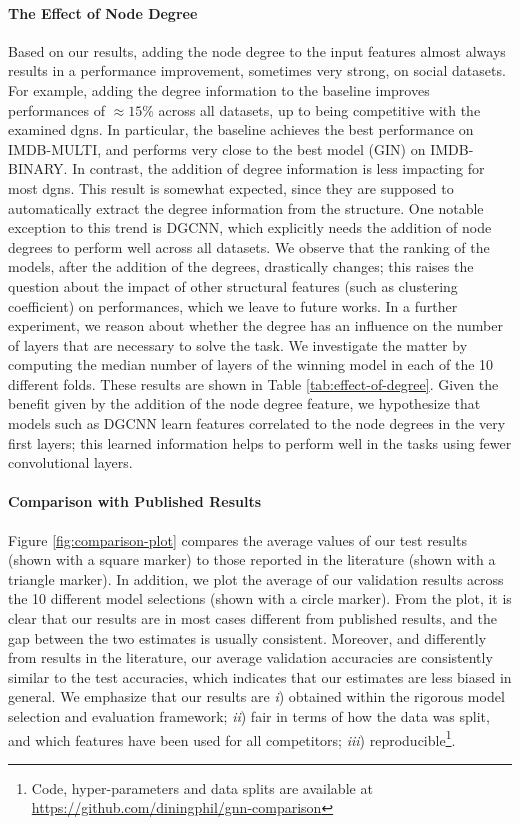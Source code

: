 \paragraph{The Effect of Node Degree}
Based on our results, adding the node degree to the input features almost always results in a performance improvement, sometimes very strong, on social datasets. For example, adding the degree information to the baseline improves performances of $\approx 15$\% across all datasets, up to being competitive with the examined \glspl{dgn}. In particular, the baseline achieves the best performance on IMDB-MULTI, and performs very close to the best model (GIN) on IMDB-BINARY. In contrast, the addition of degree information is less impacting for most \glspl{dgn}. This result is somewhat expected, since they are supposed to automatically extract the degree information from the structure. One notable exception to this trend is DGCNN, which explicitly needs the addition of node degrees to perform well across all datasets. We observe that the ranking of the models, after the addition of the degrees, drastically changes; this raises the question about the impact of other structural features (such as clustering coefficient) on performances, which we leave to future works. In a further experiment, we reason about whether the degree has an influence on the number of layers that are necessary to solve the task. We investigate the matter by computing the median number of layers of the winning model in each of the 10 different folds. These results are shown in Table \ref{tab:effect-of-degree}. Given the benefit given by the addition of the node degree feature, we hypothesize that models such as DGCNN learn features correlated to the node degrees in the very first layers; this learned information helps to perform well in the tasks using fewer convolutional layers.



\paragraph{Comparison with Published Results}
Figure \ref{fig:comparison-plot} compares the average values of our test results (shown with a square marker) to those reported in the literature (shown with a triangle marker). In addition, we plot the average of our validation results across the 10 different model selections (shown with a circle marker). From the plot, it is clear that our results are in most cases different from published results, and the gap between the two estimates is usually consistent. Moreover, and differently from results in the literature, our average validation accuracies are consistently similar to the test accuracies, which indicates that our estimates are less biased in general. We emphasize that our results are \emph{i}) obtained within the rigorous model selection and evaluation framework; \emph{ii}) fair in terms of how the data was split, and which features have been used for all competitors; \emph{iii}) reproducible\footnote{Code, hyper-parameters and data splits are available at \url{https://github.com/diningphil/gnn-comparison}}.

